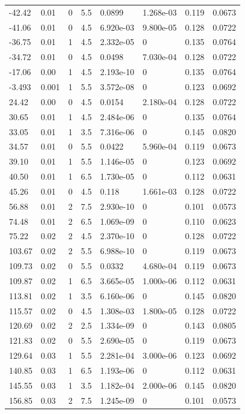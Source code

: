 \documentclass[preview]{standalone}
\begin{document}
{{\begin{tabular}{L{1.2cm}C{1.2cm} C{0.3cm}C{0.5cm} C{1.4cm}C{1.4cm} C{1.4cm}C{1.4cm}}
  -42.42  &  0.01  & 0     & 5.5 &  0.0899  & 1.268e-03  & 0.119 &  0.0673   \\ 
  -41.06  &  0.01  & 0     & 4.5 &  6.920e-03  & 9.800e-05  & 0.128 &  0.0722   \\ 
  -36.75  &  0.01  & 1     & 4.5 &  2.332e-05  & 0  & 0.135 &  0.0764   \\ 
  -34.72  &  0.01  & 0     & 4.5 &  0.0498  & 7.030e-04  & 0.128 &  0.0722   \\ 
  -17.06  &  0.00  & 1     & 4.5 &  2.193e-10  & 0  & 0.135 &  0.0764   \\ 
  -3.493  &  0.001  & 1     & 5.5 &  3.572e-08  & 0  & 0.123 &  0.0692   \\ 
  24.42  &  0.00  & 0     & 4.5 &  0.0154  & 2.180e-04  & 0.128 &  0.0722   \\ 
  30.65  &  0.01  & 1     & 4.5 &  2.484e-06  & 0  & 0.135 &  0.0764   \\ 
  33.05  &  0.01  & 1     & 3.5 &  7.316e-06  & 0  & 0.145 &  0.0820   \\ 
  34.57  &  0.01  & 0     & 5.5 &  0.0422  & 5.960e-04  & 0.119 &  0.0673   \\ 
  39.10  &  0.01  & 1     & 5.5 &  1.146e-05  & 0  & 0.123 &  0.0692   \\ 
  40.50  &  0.01  & 1     & 6.5 &  1.730e-05  & 0  & 0.112 &  0.0631   \\ 
  45.26  &  0.01  & 0     & 4.5 &  0.118  & 1.661e-03  & 0.128 &  0.0722   \\ 
  56.88  &  0.01  & 2     & 7.5 &  2.930e-10  & 0  & 0.101 &  0.0573   \\ 
  74.48  &  0.01  & 2     & 6.5 &  1.069e-09  & 0  & 0.110 &  0.0623   \\ 
  75.22  &  0.02  & 2     & 4.5 &  2.370e-10  & 0  & 0.128 &  0.0722   \\ 
  103.67  &  0.02  & 2     & 5.5 &  6.988e-10  & 0  & 0.119 &  0.0673   \\ 
  109.73  &  0.02  & 0     & 5.5 &  0.0332  & 4.680e-04  & 0.119 &  0.0673   \\ 
  109.87  &  0.02  & 1     & 6.5 &  3.665e-05  & 1.000e-06  & 0.112 &  0.0631   \\ 
  113.81  &  0.02  & 1     & 3.5 &  6.160e-06  & 0  & 0.145 &  0.0820   \\ 
  115.57  &  0.02  & 0     & 4.5 &  1.308e-03  & 1.800e-05  & 0.128 &  0.0722   \\ 
  120.69  &  0.02  & 2     & 2.5 &  1.334e-09  & 0  & 0.143 &  0.0805   \\ 
  121.83  &  0.02  & 0     & 5.5 &  2.690e-05  & 0  & 0.119 &  0.0673   \\ 
  129.64  &  0.03  & 1     & 5.5 &  2.281e-04  & 3.000e-06  & 0.123 &  0.0692   \\ 
  140.85  &  0.03  & 1     & 6.5 &  1.193e-06  & 0  & 0.112 &  0.0631   \\ 
  145.55  &  0.03  & 1     & 3.5 &  1.182e-04  & 2.000e-06  & 0.145 &  0.0820   \\ 
  156.85  &  0.03  & 2     & 7.5 &  1.245e-09  & 0  & 0.101 &  0.0573   \\ 
\hline 
\end{tabular} 

}}
\end{document}
